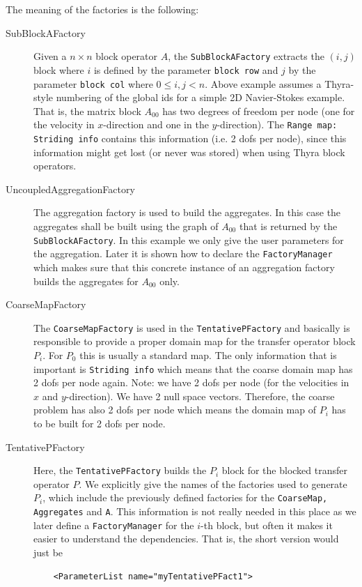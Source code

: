 \documentclass[10pt,fleqn]{book}
\begin{document}
\noindent The meaning of the factories is the following:\smallskip
\begin{description}
\item[SubBlockAFactory] Given a $n\times n$ block operator $A$, the \texttt{SubBlockAFactory} extracts the $(i,j)$ block where $i$ is defined by the parameter \texttt{block row} and $j$ by the parameter \texttt{block col} where $0\leq i,j < n$. Above example assumes a Thyra-style numbering of the global ids for a simple 2D Navier-Stokes example. That is, the matrix block $A_{00}$ has two degrees of freedom per node (one for the velocity in $x$-direction and one in the $y$-direction). The \texttt{Range map: Striding info} contains this information (i.e. 2 dofs per node), since this information might get lost (or never was stored) when using Thyra block operators.
\item[UncoupledAggregationFactory] The aggregation factory is used to build the aggregates. In this case the aggregates shall be built using the graph of $A_{00}$ that is returned by the \texttt{SubBlockAFactory}. In this example we only give the user parameters for the aggregation. Later it is shown how to declare the \texttt{FactoryManager} which makes sure that this concrete instance of an aggregation factory builds the aggregates for $A_{00}$ only.
\item[CoarseMapFactory] The \texttt{CoarseMapFactory} is used in the \texttt{TentativePFactory} and basically is responsible to provide a proper domain map for the transfer operator block $P_i$. For $P_0$ this is usually a standard map. The only information that is important is \texttt{Striding info} which means that the coarse domain map has 2 dofs per node again. Note: we have 2 dofs per node (for the velocities in $x$ and $y$-direction). We have 2 null space vectors. Therefore, the coarse problem has also 2 dofs per node which means the domain map of $P_i$ has to be built for 2 dofs per node.
\item[TentativePFactory] Here, the \texttt{TentativePFactory} builds the $P_i$ block for the blocked transfer operator $P$. We explicitly give the names of the factories used to generate $P_i$, which include the previously defined factories for the \texttt{CoarseMap, Aggregates} and \texttt{A}. This information is not really needed in this place as we later define a \texttt{FactoryManager} for the $i$-th block, but often it makes it easier to understand the dependencies. That is, the short version would just be
\begin{lstlisting}
    <ParameterList name="myTentativePFact1">

\end{lstlisting}
\end{description}
\end{document}
